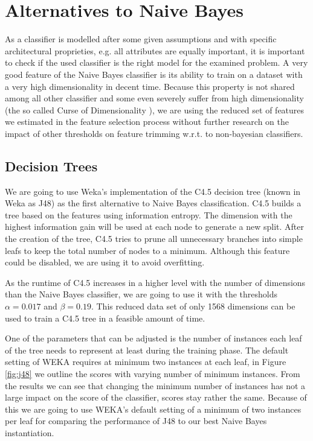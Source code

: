\section{Alternatives to Naive Bayes}
As a classifier is modelled after some given assumptions and with specific architectural proprieties, e.g. all attributes are equally important, it is important to check if the used classifier is the right model for the examined problem.
A very good feature of the Naive Bayes classifier is its ability to train on a dataset with a very high dimensionality in decent time.
Because this property is not shared among all other classifier and some even severely suffer from high dimensionality (the so called Curse of Dimensionality \cite{bellman1957dynamic}), we are using the reduced set of features we estimated in the feature selection process without further research on the impact of other thresholds on feature trimming w.r.t. to non-bayesian classifiers.

\subsection{Decision Trees}

We are going to use Weka's \cite{hall2009weka} implementation of the C4.5 decision tree \cite{Quinlan1993} (known in Weka as J48) as the first alternative to Naive Bayes classification.
C4.5 builds a tree based on the features using information entropy.
The dimension with the highest information gain will be used at each node to generate a new split.
After the creation of the tree, C4.5 tries to prune all unnecessary branches into simple leafs to keep the total number of nodes to a minimum.
Although this feature could be disabled, we are using it to avoid overfitting.

As the runtime of C4.5 increases in a higher level with the number of dimensions than the Naive Bayes classifier, we are going to use it with the thresholds $\alpha=0.017$ and $\beta=0.19$.
This reduced data set of only 1568 dimensions can be used to train a C4.5 tree in a feasible amount of time.



One of the parameters that can be adjusted is the number of instances each leaf of the tree needs to represent at least during the training phase.
The default setting of WEKA requires at minimum two instances at each leaf, in Figure \ref{fig:j48} we outline the scores with varying number of minimum instances.
From the results we can see that changing the minimum number of instances has not a large impact on the score of the classifier, scores stay rather the same.
Because of this we are going to use WEKA's default setting of a minimum of two instances per leaf for comparing the performance of J48 to our best Naive Bayes instantiation.

